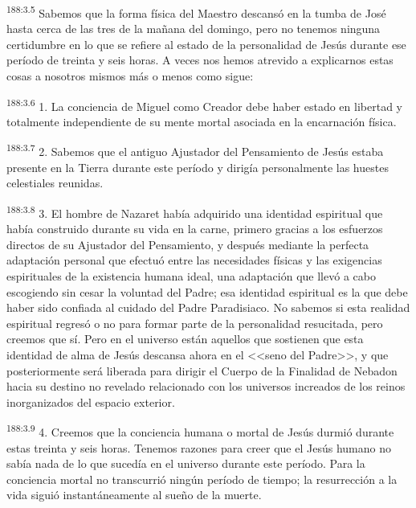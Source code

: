 \par 
\textsuperscript{188:3.5} Sabemos que la forma física del Maestro descansó en la tumba de José hasta cerca de las tres de la mañana del domingo, pero no tenemos ninguna certidumbre en lo que se refiere al estado de la personalidad de Jesús durante ese período de treinta y seis horas. A veces nos hemos atrevido a explicarnos estas cosas a nosotros mismos más o menos como sigue:

\par 
\textsuperscript{188:3.6} 1. La conciencia de Miguel como Creador debe haber estado en libertad y totalmente independiente de su mente mortal asociada en la encarnación física.

\par 
\textsuperscript{188:3.7} 2. Sabemos que el antiguo Ajustador del Pensamiento de Jesús estaba presente en la Tierra durante este período y dirigía personalmente las huestes celestiales reunidas.

\par 
\textsuperscript{188:3.8} 3. El hombre de Nazaret había adquirido una identidad espiritual que había construido durante su vida en la carne, primero gracias a los esfuerzos directos de su Ajustador del Pensamiento, y después mediante la perfecta adaptación personal que efectuó entre las necesidades físicas y las exigencias espirituales de la existencia humana ideal, una adaptación que llevó a cabo escogiendo sin cesar la voluntad del Padre; esa identidad espiritual es la que debe haber sido confiada al cuidado del Padre Paradisiaco. No sabemos si esta realidad espiritual regresó o no para formar parte de la personalidad resucitada, pero creemos que sí. Pero en el universo están aquellos que sostienen que esta identidad de alma de Jesús descansa ahora en el <<seno del Padre>>, y que posteriormente será liberada para dirigir el Cuerpo de la Finalidad de Nebadon hacia su destino no revelado relacionado con los universos increados de los reinos inorganizados del espacio exterior.

\par 
\textsuperscript{188:3.9} 4. Creemos que la conciencia humana o mortal de Jesús durmió durante estas treinta y seis horas. Tenemos razones para creer que el Jesús humano no sabía nada de lo que sucedía en el universo durante este período. Para la conciencia mortal no transcurrió ningún período de tiempo; la resurrección a la vida siguió instantáneamente al sueño de la muerte.

